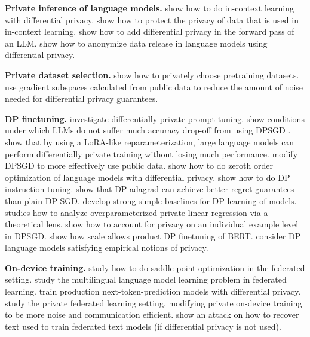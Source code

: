 \documentclass{article}
\theoremstyle{plain}
\theoremstyle{definition}
\theoremstyle{remark}
\begin{document}
\textbf{Private inference of language models.} \citet{tang2023privacy, wu2023privacy} show how to do in-context learning with differential privacy. \citet{duan2024flocks} show how to protect the privacy of data that is used in in-context learning. \citet{du2023dp} show how to add differential privacy in the forward pass of an LLM.  \citet{mattern2022differentially} show how to anonymize data release in language models using differential privacy.

\textbf{Private dataset selection.} \citet{gu2023choosing, hou2023privately} show how to privately choose pretraining datasets. \citet{Zhou2020BypassingTA} use gradient subspaces calculated from public data to reduce the amount of noise needed for differential privacy guarantees.

\textbf{DP finetuning.} \citet{li2023privacy} investigate differentially private prompt tuning. \citet{li2022does} show conditions under which LLMs do not suffer much accuracy drop-off from using DPSGD \citep{abadi2016deep}. \citet{yu2021large} show that by using a LoRA-like reparameterization, large language models can perform differentially private training without losing much performance. \citet{nasr2023effectively} modify DPSGD to more effectively use public data.  \citet{zhang2023dpzero,tang2024private} show how to do zeroth order optimization of language models with differential privacy. \citet{yu2024privacy} show how to do DP instruction tuning. \citet{Kairouz2020DimensionII} show that DP adagrad can achieve better regret guarantees than plain DP SGD. \citet{Tramr2020DifferentiallyPL} develop strong simple baselines for DP learning of models. \citet{wang2023private} studies how to analyze overparameterized private linear regression via a theoretical lens.  \citet{yu2022individual} show how to account for privacy on an individual example level in DPSGD.  \citet{anil2021large} show how scale allows product DP finetuning of BERT. \citet{xu2021utilitarian, mireshghallah2021privacy} consider DP language models satisfying empirical notions of privacy.  

\textbf{On-device training.} \citet{Hou2021EfficientAF} study how to do saddle point optimization in the federated setting. \citet{weller2022pretrained} study the multilingual language model learning problem in federated learning. \citet{ramaswamy2020training} train production next-token-prediction models with differential privacy. \citet{xu2023training} study the private federated learning setting, modifying private on-device training to be more noise and communication efficient. \citet{gupta2022recovering} show an attack on how to recover text used to train federated text models (if differential privacy is not used). 
\end{document}

